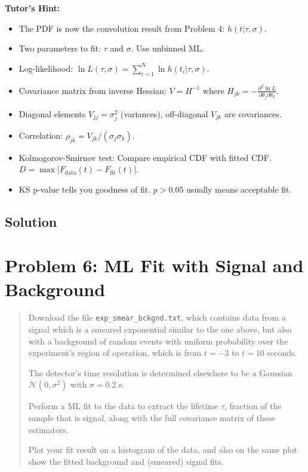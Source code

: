 \documentclass[11pt]{article}
\begin{document}
\textbf{Tutor's Hint:}
\begin{itemize}
    \item The PDF is now the convolution result from Problem 4: $h(t|\tau, \sigma)$.
    \item Two parameters to fit: $\tau$ and $\sigma$. Use unbinned ML.
    \item Log-likelihood: $\ln L(\tau, \sigma) = \sum_{i=1}^{N} \ln h(t_i|\tau, \sigma)$.
    \item Covariance matrix from inverse Hessian: $V = H^{-1}$ where $H_{jk} = -\frac{\partial^2 \ln L}{\partial\theta_j \partial\theta_k}$.
    \item Diagonal elements $V_{jj} = \sigma_j^2$ (variances), off-diagonal $V_{jk}$ are covariances.
    \item Correlation: $\rho_{jk} = V_{jk}/(\sigma_j \sigma_k)$.
    \item Kolmogorov-Smirnov test: Compare empirical CDF with fitted CDF. $D = \max|F_{\text{data}}(t) - F_{\text{fit}}(t)|$.
    \item KS p-value tells you goodness of fit. $p > 0.05$ usually means acceptable fit.
\end{itemize}

\subsection{Solution}


\section{Problem 6: ML Fit with Signal and Background}

\begin{quote}
    Download the file \texttt{exp\_smear\_bckgnd.txt}, which contains data from a signal which is a smeared exponential similar to the one above, but also with a background of random events with uniform probability over the experiment's region of operation, which is from $t = -3$ to $t = 10$ seconds.

    The detector's time resolution is determined elsewhere to be a Gaussian $\mathcal{N}(0, \sigma^2)$ with $\sigma = 0.2$ s.

    Perform a ML fit to the data to extract the lifetime $\tau$, fraction of the sample that is signal, along with the full covariance matrix of these estimators.

    Plot your fit result on a histogram of the data, and also on the same plot show the fitted background and (smeared) signal fits.
\end{quote}
\end{document}
